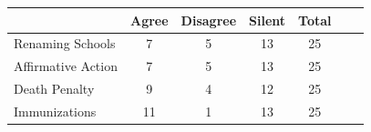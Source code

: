 \begin{tabular}{l*{6}c}\toprule 
& Agree & Disagree & Silent & Total \\
\midrule
Renaming Schools &  7 &  5 & 13 & 25 \\
Affirmative Action &  7 &  5 & 13 & 25 \\
Death Penalty &  9 &  4 & 12 & 25 \\
Immunizations & 11 &  1 & 13 & 25 \\
\bottomrule
\end{tabular}
